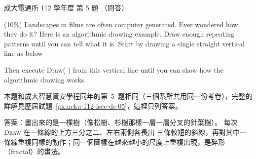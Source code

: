 \begin{pastexam}[label={px:ncku-112-cce-ds-05}]{成大電通所 112 學年度 第 5 題}
（問答）

(10\%) Landscapes in films are often computer generated. Ever wondered how they do it? Here is an
algorithmic drawing example. Draw enough repeating patterns until you can tell what it is. Start by
drawing a single straight vertical line as below

\begin{center}
\end{center}

Then execute Draw( ) from this vertical line until you can show how the algorithmic drawing works.

\begin{center}
\end{center}
\end{pastexam}

\begin{pastsoln}
本題和成大智慧資安學程同年的第~5~題相同（三個系所共用同一份考卷），完整的詳解見歷屆試題~\ref{px:ncku-112-isec-ds-05}，這裡只列答案。

答案：畫出來的是一棵樹（像松樹、杉樹那樣一層一層分叉的針葉樹）。 每次 \textsc{Draw} 在一條線的上方三分之二、左右兩側各長出
三條較短的斜線，再對其中一條線重複同樣的動作；同一個圖樣在越來越小的尺度上重複出現，是碎形（fractal）的畫法。
\end{pastsoln}
